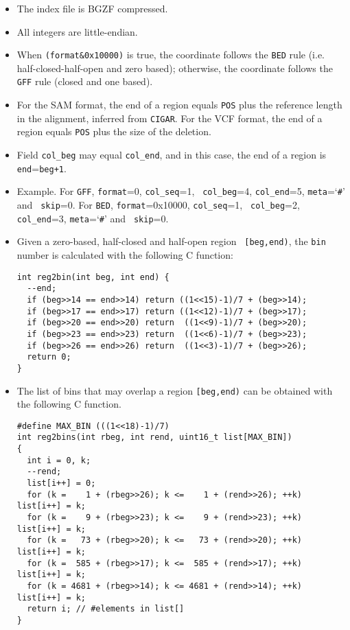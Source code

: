 \documentclass[10pt]{article}
\begin{document}
\begin{itemize}
\item The index file is BGZF compressed.
\item All integers are little-endian.
\item When {\tt (format\&0x10000)} is true, the coordinate follows the
  {\tt BED} rule (i.e. half-closed-half-open and zero based); otherwise,
  the coordinate follows the {\tt GFF} rule (closed and one based).
\item For the SAM format, the end of a region equals {\tt POS} plus the
  reference length in the alignment, inferred from {\tt CIGAR}. For the
  VCF format, the end of a region equals {\tt POS} plus the size of the
  deletion.
\item Field {\tt col\_beg} may equal {\tt col\_end}, and in this case,
  the end of a region is {\tt end}={\tt beg+1}.
\item Example. For {\tt GFF}, {\tt format}=0, {\tt col\_seq}=1, {\tt
    col\_beg}=4, {\tt col\_end}=5, {\tt meta}=`{\tt \#}' and {\tt
    skip}=0. For {\tt BED}, {\tt format}=0x10000, {\tt col\_seq}=1, {\tt
    col\_beg}=2, {\tt col\_end}=3, {\tt meta}=`{\tt \#}' and {\tt
    skip}=0.
\item Given a zero-based, half-closed and half-open region {\tt
    [beg,end)}, the {\tt bin} number is calculated with the following C
  function:
\begin{verbatim}
int reg2bin(int beg, int end) {
  --end;
  if (beg>>14 == end>>14) return ((1<<15)-1)/7 + (beg>>14);
  if (beg>>17 == end>>17) return ((1<<12)-1)/7 + (beg>>17);
  if (beg>>20 == end>>20) return  ((1<<9)-1)/7 + (beg>>20);
  if (beg>>23 == end>>23) return  ((1<<6)-1)/7 + (beg>>23);
  if (beg>>26 == end>>26) return  ((1<<3)-1)/7 + (beg>>26);
  return 0;
}
\end{verbatim}
\item The list of bins that may overlap a region {\tt [beg,end)} can be
  obtained with the following C function.
\begin{verbatim}
#define MAX_BIN (((1<<18)-1)/7)
int reg2bins(int rbeg, int rend, uint16_t list[MAX_BIN])
{
  int i = 0, k;
  --rend;
  list[i++] = 0;
  for (k =    1 + (rbeg>>26); k <=    1 + (rend>>26); ++k) list[i++] = k;
  for (k =    9 + (rbeg>>23); k <=    9 + (rend>>23); ++k) list[i++] = k;
  for (k =   73 + (rbeg>>20); k <=   73 + (rend>>20); ++k) list[i++] = k;
  for (k =  585 + (rbeg>>17); k <=  585 + (rend>>17); ++k) list[i++] = k;
  for (k = 4681 + (rbeg>>14); k <= 4681 + (rend>>14); ++k) list[i++] = k;
  return i; // #elements in list[]
}
\end{verbatim}
\end{itemize}
\end{document}
